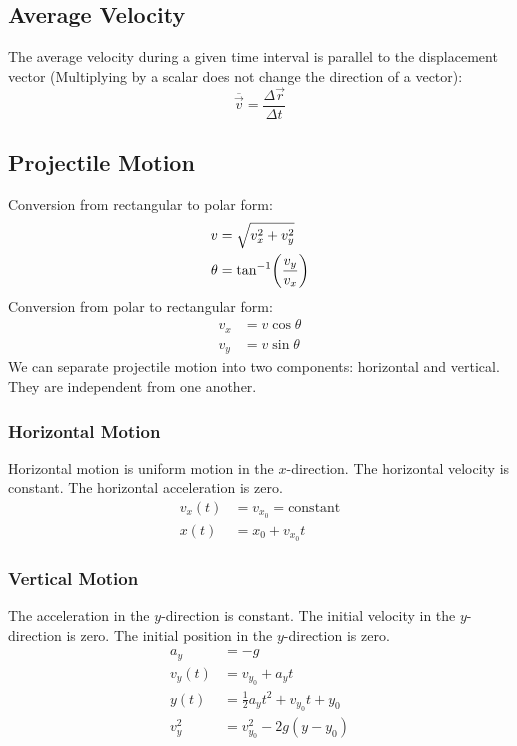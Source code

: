 \documentclass[article, 11pt]{article}
\theoremstyle{definition}
\DeclarePairedDelimiter\paren{(}{)} %
\begin{document}
    \subsection{Average Velocity}
    The average velocity during a given time interval is parallel to the displacement vector (Multiplying by a scalar does not change the direction of a vector):
    \begin{equation}
        \overline{\vec{v}} = \frac{\Delta \vec{r}}{\Delta t} 
        \label{eq:average velocity 2d}
    \end{equation}
    \subsection{Projectile Motion}
    Conversion from rectangular to polar form:
    \begin{align}
        v &= \sqrt{v_x^2 + v_y^2} \\
        \theta &= \tan^{-1}\paren*{\frac{v_y}{v_x}}
        \label{rectangular to polar}
    \end{align}
    Conversion from polar to rectangular form:
    \begin{align}
        v_x &= v\cos\theta \\
        v_y &= v\sin\theta
        \label{polar to rectangular}
    \end{align}
    We can separate projectile motion into two components: horizontal and vertical. They are independent from one another.
    \subsubsection{Horizontal Motion}
    Horizontal motion is uniform motion in the $x$-direction. The horizontal velocity is constant. The horizontal acceleration is zero.
    \begin{align}
        v_x(t) &= v_{x_0} = \text{constant} \\
        x(t) &=x_0 + v_{x_0}t
    \end{align}
    \subsubsection{Vertical Motion}
    The acceleration in the $y$-direction is constant. The initial velocity in the $y$-direction is zero. The initial position in the $y$-direction is zero.
    \begin{align}
        a_y &= -g \\
        v_y(t) &= v_{y_0} + a_yt \\
        y(t) &= \frac{1}{2}a_yt^2 + v_{y_0}t + y_0 \\
        v_y^2 &= v_{y_0}^2 - 2g(y - y_0)
    \end{align}
\end{document}
